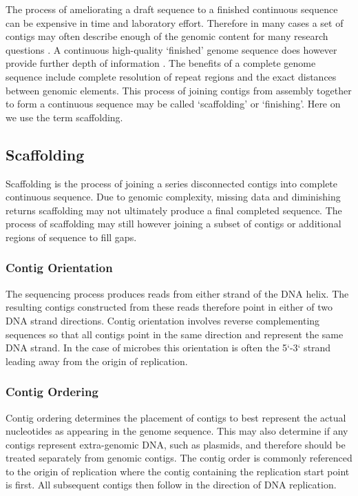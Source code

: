 \documentclass[10pt]{bmc_article}
\newenvironment{bmcformat}{\begin{raggedright}\baselineskip20pt\sloppy\setboolean{publ}{false}}{\end{raggedright}\baselineskip20pt\sloppy}
\begin{document}
\begin{bmcformat}
The process of ameliorating a draft sequence to a finished continuous sequence
can be expensive in time and laboratory effort. Therefore in many cases a set
of contigs may often describe enough of the genomic content for many research
questions \cite{branscomb2002}. A continuous high-quality `finished' genome
sequence does however provide further depth of information
\cite{parkhill2002,fraser2002}. The benefits of a complete genome sequence
include complete resolution of repeat regions and the exact distances between
genomic elements. This process of joining contigs from assembly together to form
a continuous sequence may be called `scaffolding' or `finishing'. Here on we
use the term scaffolding. \pb

\subsection*{Scaffolding} %

Scaffolding is the process of joining a series disconnected contigs into
complete continuous sequence. Due to genomic complexity, missing data and
diminishing returns scaffolding may not ultimately produce a final completed
sequence. The process of scaffolding may still however joining a subset of
contigs or additional regions of sequence to fill gaps.

\subsubsection*{Contig Orientation} %

The sequencing process produces reads from either strand of the DNA helix. The
resulting contigs constructed from these reads therefore point in either of two
DNA strand directions. Contig orientation involves reverse complementing
sequences so that all contigs point in the same direction and represent the
same DNA strand. In the case of microbes this orientation is often the 5`-3`
strand leading away from the origin of replication.

\subsubsection*{Contig Ordering} %

Contig ordering determines the placement of contigs to best represent the
actual nucleotides as appearing in the genome sequence. This may also determine
if any contigs represent extra-genomic DNA, such as plasmids, and therefore
should be treated separately from genomic contigs. The contig order is commonly
referenced to the origin of replication where the contig containing the
replication start point is first. All subsequent contigs then follow in the
direction of DNA replication.


\end{bmcformat}
\end{document}

